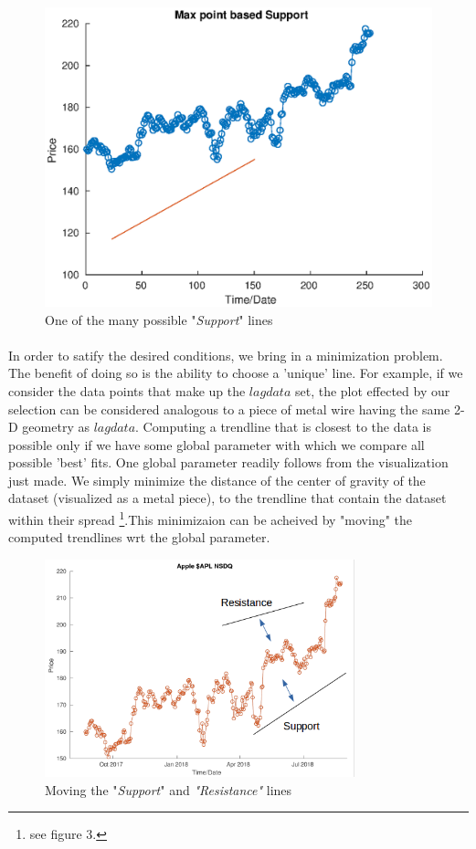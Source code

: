 \documentclass[letterpaper, 12pt] {article}
\begin{document}
	\begin{figure}[h!]
		\centering
		\includegraphics[scale = 0.45]{max_supp}
		\caption{One of the many possible "\textit{Support}" lines}
		\label{Figure 2}
	\end{figure}
	
	\paragraph{}
	In order to satify the desired conditions, we bring in a minimization problem. The benefit of doing so is the ability to choose a 'unique' line. For example, if we consider the data points that make up the $lagdata$ set, the plot effected by our selection can be considered analogous to a piece of metal wire having the same 2-D geometry as $lagdata$. Computing a trendline that is closest to the data is possible only if we have some global parameter with which we compare all possible 'best' fits. One global parameter readily follows from the visualization just made. We simply minimize the distance of the center of gravity of the dataset (visualized as a metal piece), to the trendline that contain the dataset within their spread \footnote{see figure 3.}.This minimizaion can be acheived by "moving" the computed trendlines wrt the global parameter.   
	
	\begin{figure}[h!]
		\centering
		\includegraphics[width=0.8\textwidth]{cogs_minimize}
		\caption{Moving the "\textit{Support}" and \textit{"Resistance"} lines}
		\label{Figure 3}
	\end{figure}
	
\end{document}
